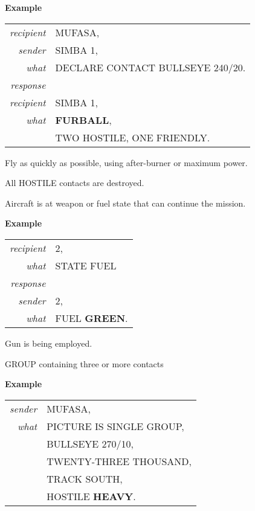 \begin{tcoloritemize}
    \medskip
    \textbf{Example}
    \begin{center}
        \begin{tabular}{>{\itshape}r l}
            recipient & MUFASA, \\
            sender & SIMBA 1, \\
            what & DECLARE CONTACT BULLSEYE 240/20.\\
            response \\
            recipient & SIMBA 1, \\
            what & \textbf{FURBALL}, \\
            & TWO HOSTILE, ONE FRIENDLY.\\
        \end{tabular}
    \end{center}

    \blueitem[GATE]
    Fly as quickly as possible, using after-burner or
    maximum power.

    \blueitem[GRANDSLAM]
    All HOSTILE contacts are destroyed.

    \blueitem[GREEN]
    Aircraft is at weapon or fuel state that can continue the mission.

    \medskip
    \textbf{Example}
    \begin{center}
        \begin{tabular}{>{\itshape}r l}
            recipient & 2, \\
            what & STATE FUEL\\
            response \\
            sender & 2, \\
            what & FUEL \textbf{GREEN}. \\
        \end{tabular}
    \end{center}

    \blueitem[GUNS]
    Gun is being employed.

    \blueitem[HEAVY]
    GROUP containing three or more contacts

    \medskip
    \textbf{Example}
    \begin{center}
        \begin{tabular}{>{\itshape}r l}
            sender & MUFASA, \\
            what & PICTURE IS SINGLE GROUP,\\
            & BULLSEYE 270/10, \\
            & TWENTY-THREE THOUSAND, \\
            & TRACK SOUTH, \\
            & HOSTILE \textbf{HEAVY}.\\
        \end{tabular}
    \end{center}


\end{tcoloritemize}
